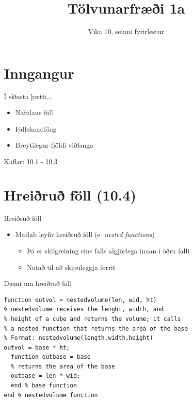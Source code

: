 \documentclass{beamer}
\title{Tölvunarfræði 1a}
\subtitle{Vika 10, seinni fyrirlestur}
\begin{document}
\begin{frame}
\titlepage
\end{frame}

\section{Inngangur}

\begin{frame}{Í síðasta þætti\ldots}
\begin{itemize}
 \item Nafnlaus föll
 \item Fallshandföng
 \item Breytilegur fjöldi viðfanga
\end{itemize}
Kaflar: 10.1 - 10.3 
\end{frame}

\section{Hreiðruð föll (10.4)}

\begin{frame}{Hreiðruð föll}
\begin{itemize}
 \item Matlab leyfir hreiðruð föll (e. \emph{nested functions})
 \begin{itemize}
  \item Þá er skilgreining eins falls algjörlega innan í öðru falli
  \item Notað til að skipuleggja forrit
 \end{itemize}
\end{itemize}
\end{frame}

\begin{frame}[fragile]{Dæmi um hreiðrað fall}
\begin{verbatim}
function outvol = nestedvolume(len, wid, ht)
% nestedvolume receives the lenght, width, and
% height of a cube and returns the volume; it calls
% a nested function that returns the area of the base
% Format: nestedvolume(length,width,height)
outvol = base * ht;
  function outbase = base
  % returns the area of the base
  outbase = len * wid;
  end % base function
end % nestedvolume function
\end{verbatim}

\end{frame}
\end{document}
